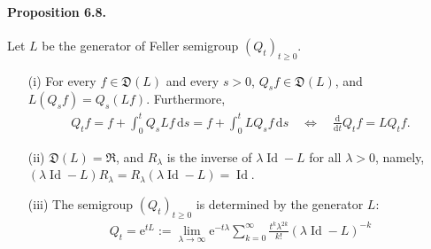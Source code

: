 \documentclass{article}
\numberwithin{equation}{section}
\newcommand{\e}{\mathrm{e}}
\DeclareMathOperator{\id}{Id}
\renewcommand{\d}{\mathrm{d}}
\theoremstyle{plain}
\theoremstyle{definition}
\begin{document}
\paragraph{Proposition 6.8.\label{prop:6.8}} Let $L$ be the generator of Feller semigroup $(Q_t)_{t\geq 0}$.
\begin{itemize}
	\item[(i)] For every $f\in\mathfrak{D}(L)$ and every $s>0$, $Q_sf\in\mathfrak{D}(L)$, and $L(Q_sf)=Q_s(Lf)$. Furthermore,
	\begin{align*}
		Q_tf = f+\int_0^t Q_sLf\,\d s = f+\int_0^t LQ_sf\,\d s\quad\Leftrightarrow\quad  \frac{\d}{\d t}Q_tf=LQ_tf.\tag{6.1}\label{eq:6.1}
	\end{align*}
	\item[(ii)] $\mathfrak{D}(L)=\mathfrak{R}$, and $R_\lambda$ is the inverse of $\lambda\id-L$ for all $\lambda>0$, namely, $(\lambda\id-L)R_\lambda=R_\lambda(\lambda\id-L)=\id$.
	\item[(iii)] The semigroup $(Q_t)_{t\geq 0}$ is determined by the generator $L$:
	\begin{align*}
		Q_t = \e^{tL} := \lim_{\lambda\to\infty}\e^{-t\lambda}\sum_{k=0}^\infty\frac{t^k\lambda^{2k}}{k!}(\lambda\id - L)^{-k}
	\end{align*}
\end{itemize}
\end{document}
